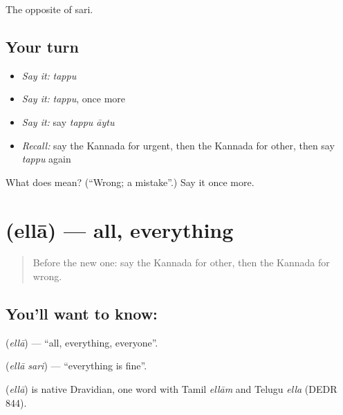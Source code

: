 \begin{grammarlens}[title={What you've built}]
The opposite of sari.
\end{grammarlens}

\subsection*{Your turn}
\begin{itemize}
\raggedright
  \item \emph{Say it:} \emph{tappu}
  \item \emph{Say it:} \emph{tappu}, once more
  \item \emph{Say it:} say \emph{tappu āytu}
  \item \emph{Recall:} say the Kannada for urgent, then the Kannada for other, then say \emph{tappu} again
\end{itemize}

\begin{tcolorbox}[breakable,colback=teal!4,colframe=teal!35!black,title={Before you move on}]
What does  mean? (\textquotedblleft{}Wrong; a mistake\textquotedblright{}.) Say it once more.
\end{tcolorbox}
\section[\texorpdfstring{\kn{ಎಲ್ಲಾ} (ellā)}{ಎಲ್ಲಾ (ellā)}]{ (ellā) — all, everything}

\label{lesson:KA-C102-all}



\begin{quote}
Before the new one: say the Kannada for other, then the Kannada for wrong.
\end{quote}

\subsection*{You'll want to know: }
\textbf{} (\emph{ellā}) — \textquotedblleft{}all, everything, everyone\textquotedblright{}.

\textbf{ } (\emph{ellā sari}) — \textquotedblleft{}everything is fine\textquotedblright{}.

\begin{cousinweb}
\textbf{} (\emph{ellā}) is native Dravidian, one word with Tamil \emph{ellām} and Telugu \emph{ella} (DEDR 844).
\end{cousinweb}

